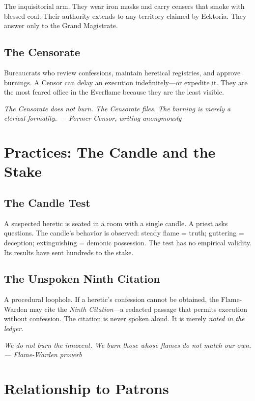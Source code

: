 \documentclass{book}
\newcommand{\citation}[1]{\textcolor{marginalia}{\small\textit{#1}}}
\begin{document}
The inquisitorial arm. They wear iron masks and carry censers that smoke with blessed coal. Their authority extends to any territory claimed by Ecktoria. They answer only to the Grand Magistrate.

\section{The Censorate}

Bureaucrats who review confessions, maintain heretical registries, and approve burnings. A Censor can delay an execution indefinitely---or expedite it. They are the most feared office in the Everflame because they are the least visible.

\citation{The Censorate does not burn. The Censorate files. The burning is merely a clerical formality. --- Former Censor, writing anonymously}

\chapter{Practices: The Candle and the Stake}

\section{The Candle Test}

A suspected heretic is seated in a room with a single candle. A priest asks questions. The candle's behavior is observed: steady flame = truth; guttering = deception; extinguishing = demonic possession. The test has no empirical validity. Its results have sent hundreds to the stake.

\section{The Unspoken Ninth Citation}

A procedural loophole. If a heretic's confession cannot be obtained, the Flame-Warden may cite the \textit{Ninth Citation}---a redacted passage that permits execution without confession. The citation is never spoken aloud. It is merely \textit{noted in the ledger}.

\citation{We do not burn the innocent. We burn those whose flames do not match our own. --- Flame-Warden proverb}

\chapter{Relationship to Patrons}
\end{document}
